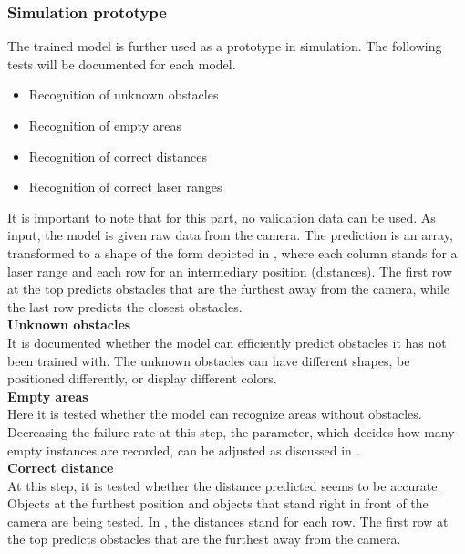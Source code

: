 \subsubsection{Simulation prototype \label{sim_prototype} }
The trained model is further used as a prototype in simulation. The following tests will be documented for each model. 

\begin{itemize}
\item Recognition of unknown obstacles
\item Recognition of empty areas
\item Recognition of correct distances
\item Recognition of correct laser ranges
\end{itemize}

It is important to note that for this part, no validation data can be used. As input, the model is given raw data from the camera. The prediction is an array, transformed to a shape of the form depicted in , where each column stands for a laser range and each row for an intermediary position (distances). The first row at the top predicts obstacles that are the furthest away from the camera, while the last row predicts the closest obstacles.\\


\textbf{Unknown obstacles}\\
It is documented whether the model can efficiently predict obstacles it has not been trained with. The unknown obstacles can have different shapes, be positioned differently, or display different colors.\\

\textbf{Empty areas}\\
Here it is tested whether the model can recognize areas without obstacles. Decreasing the failure rate at this step, the parameter, which decides how many empty instances are recorded, can be adjusted as discussed in .\\

\textbf{Correct distance}\\
At this step, it is tested whether the distance predicted seems to be accurate. Objects at the furthest position and objects that stand right in front of the camera are being tested. In , the distances stand for each row. The first row at the top predicts obstacles that are the furthest away from the camera.\\


